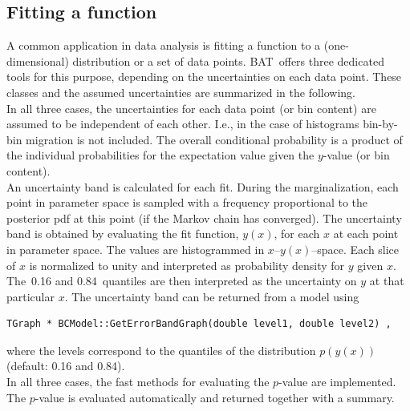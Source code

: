 \documentclass[11pt, a4paper]{article}
\newcommand{\BAT}{{\sc BAT}}
\begin{document}

\subsection{Fitting a function} 
\label{subsection:fitting}

A common application in data analysis is fitting a function to a
(one-dimensional) distribution or a set of data points. \BAT\ offers
three dedicated tools for this purpose, depending on the uncertainties
on each data point. These classes and the assumed uncertainties are
summarized in the following. \\

\noindent 
In all three cases, the uncertainties for each data point (or bin
content) are assumed to be independent of each other. I.e., in the
case of histograms bin-by-bin migration is not included. The overall
conditional probability is a product of the individual probabilities
for the expectation value given the $y$-value (or bin content). \\

\noindent 
An uncertainty band is calculated for each fit. During the
marginalization, each point in parameter space is sampled with a
frequency proportional to the posterior pdf at this point (if the
Markov chain has converged). The uncertainty band is obtained by
evaluating the fit function, $y(x)$, for each $x$ at each point in
parameter space. The values are histogrammed in
$x$--$y(x)$--space. Each slice of $x$ is normalized to unity and
interpreted as probability density for $y$ given $x$. The~0.16 and
0.84~quantiles are then interpreted as the uncertainty on $y$ at that
particular $x$. The uncertainty band can be returned from a model using 
%
\begin{verbatim}
TGraph * BCModel::GetErrorBandGraph(double level1, double level2) ,  
\end{verbatim}
%
where the levels correspond to the quantiles of the distribution
$p(y(x))$ (default: 0.16 and 0.84). \\

\noindent 
In all three cases, the fast methods for evaluating the $p$-value are
implemented. The $p$-value is evaluated automatically and returned
together with a summary.

\end{document}
